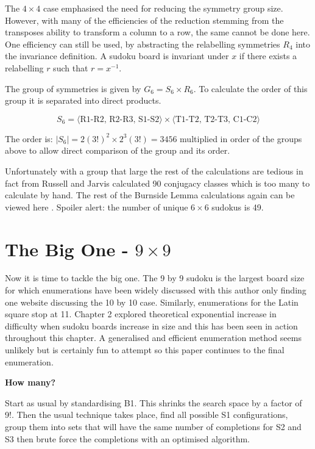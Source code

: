 \documentclass[a4paper,11pt]{report}
\newcounter{row}
\newcounter{col}
\begin{document}
The $4\times 4$ case emphasised the need for reducing the symmetry group size. However, with many of the efficiencies of the reduction stemming from the transposes ability to transform a column to a row, the same cannot be done here. One efficiency can still be used, by abstracting the relabelling symmetries $R_4$ into the invariance definition. A sudoku board is invariant under $x$ if there exists a relabelling $r$ such that $r=x^{-1}$. 

The group of symmetries is given by $G_6=S_6\times R_6$. To calculate the order of this group it is separated into direct products. 

\begin{equation}
S_6=\langle\text{R1-R2, R2-R3, S1-S2}\rangle\times \langle\text{T1-T2, T2-T3, C1-C2}\rangle 
\end{equation}

The order is: $|S_6|=2(3!)^2\times 2^3(3!) =3456$ multiplied in order of the groups above to allow direct comparison of the group and its order. 

Unfortunately with a group that large the rest of the calculations are tedious in fact from \cite{Jarvis2005} Russell and Jarvis calculated 90 conjugacy classes which is too many to calculate by hand. The rest of the Burnside Lemma calculations again can be viewed here \cite{Jarvis2005}. Spoiler alert: the number of unique $6\times 6$ sudokus is 49.

\section{The Big One - $9 \times 9$}

Now it is time to tackle the big one. The 9 by 9 sudoku is the largest board size for which enumerations have been widely discussed with this author only finding one website discussing the 10 by 10 case. Similarly, enumerations for the Latin square stop at 11. Chapter 2 explored theoretical exponential increase in difficulty when sudoku boards increase in size and this has been seen in action throughout this chapter. A generalised and efficient enumeration method seems unlikely but is certainly fun to attempt so this paper continues to the final enumeration.

\textbf{How many?}

Start as usual by standardising B1. This shrinks the search space by a factor of 9!. Then the usual technique takes place, find all possible S1 configurations, group them into sets that will have the same number of completions for S2 and S3 then brute force the completions with an optimised algorithm.
\end{document}
